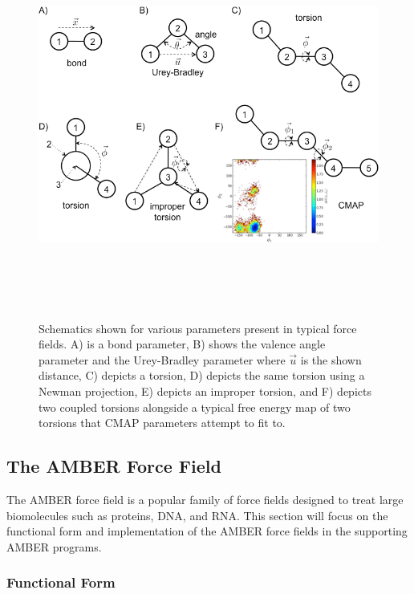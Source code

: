 \begin{figure}
   \includegraphics[width=7in,height=5in]{Parameters.png}
   \caption{Schematics shown for various parameters present in typical force
            fields. A) is a bond parameter, B) shows the valence angle parameter
            and the Urey-Bradley parameter where $\vec{u}$ is the shown
            distance, C) depicts a torsion, D) depicts the same torsion using a
            Newman projection, E) depicts an improper torsion, and F) depicts
            two coupled torsions alongside a typical free energy map of two
            torsions that CMAP parameters attempt to fit to.}
   \label{fig1:Parameters}
\end{figure}

\subsection{The AMBER Force Field}

The AMBER force field is a popular family of force fields designed to treat
large biomolecules such as proteins, DNA, and RNA. This section will focus on
the functional form and implementation of the AMBER force fields
\cite{Cornell_JAmChemSoc_1995_v117_p5179, Duan03, Hornak_Proteins_2006_v65_p712}
in the supporting AMBER programs. \cite{Case_JComputChem_2005_v26_p1668}

\subsubsection{Functional Form}

